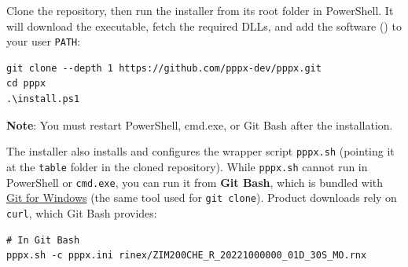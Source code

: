 Clone the repository, then run the installer from its root folder in PowerShell.
It will download the executable, fetch the required DLLs, and add the software
() to your user \texttt{PATH}:

\begin{verbatim}
git clone --depth 1 https://github.com/pppx-dev/pppx.git
cd pppx
.\install.ps1
\end{verbatim}

\textbf{Note}: You must restart PowerShell, cmd.exe, or Git Bash after the installation.

The installer also installs and configures the wrapper script \texttt{pppx.sh}
(pointing it at the \texttt{table} folder in the cloned repository). While \texttt{pppx.sh}
cannot run in PowerShell or \texttt{cmd.exe}, you can run it from \textbf{Git Bash}, which
is bundled with \href{https://git-scm.com/download/win}{Git for Windows} (the same tool
used for \texttt{git clone}). Product downloads rely on \texttt{curl}, which Git Bash
provides:

\begin{verbatim}
# In Git Bash
pppx.sh -c pppx.ini rinex/ZIM200CHE_R_20221000000_01D_30S_MO.rnx
\end{verbatim}










